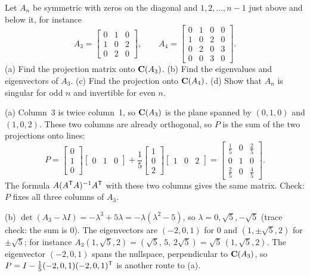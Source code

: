 \begin{example}\label{ex:u27-family}
Let $A_n$ be symmetric with zeros on the diagonal and $1,2,\dots,n-1$ just above and below
it, for instance
\[
  A_3=\begin{bmatrix} 0&1&0\\ 1&0&2\\ 0&2&0\end{bmatrix},\qquad
  A_4=\begin{bmatrix} 0&1&0&0\\ 1&0&2&0\\ 0&2&0&3\\ 0&0&3&0\end{bmatrix}.
\]
(a) Find the projection matrix onto $\mathbf{C}(A_3)$. (b) Find the eigenvalues and eigenvectors of
$A_3$. (c) Find the projection onto $\mathbf{C}(A_4)$. (d) Show that $A_n$ is singular for odd $n$ and
invertible for even $n$.

(a) Column~3 is twice column~1, so $\mathbf{C}(A_3)$ is the plane spanned by $(0,1,0)$ and
$(1,0,2)$. These two columns are already orthogonal, so $P$ is the sum of the two
projections onto lines:
\[
  P=\begin{bmatrix} 0\\ 1\\ 0\end{bmatrix}\begin{bmatrix} 0&1&0\end{bmatrix}
   +\frac15\begin{bmatrix} 1\\ 0\\ 2\end{bmatrix}\begin{bmatrix} 1&0&2\end{bmatrix}
  =\begin{bmatrix} \tfrac15&0&\tfrac25\\ 0&1&0\\ \tfrac25&0&\tfrac45\end{bmatrix}.
\]
The formula $A(A^{\mathsf{T}} A)^{-1}A^{\mathsf{T}}$ with these two columns gives the same matrix. Check: $P$
fixes all three columns of $A_3$.

(b) $\det(A_3-\lambda I)=-\lambda^{3}+5\lambda=-\lambda(\lambda^{2}-5)$, so
$\lambda=0,\sqrt5,-\sqrt5$ (trace check: the sum is $0$). The eigenvectors are
$(-2,0,1)$ for $0$ and $(1,\pm\sqrt5,2)$ for $\pm\sqrt5$; for instance
$A_3(1,\sqrt5,2)=(\sqrt5,\,5,\,2\sqrt5)=\sqrt5\,(1,\sqrt5,2)$. The eigenvector
$(-2,0,1)$ spans the nullspace, perpendicular to $\mathbf{C}(A_3)$, so $P=I-\tfrac15(-2,0,1)(-2,0,1)^{\mathsf{T}}$
is another route to (a).


\end{example}
